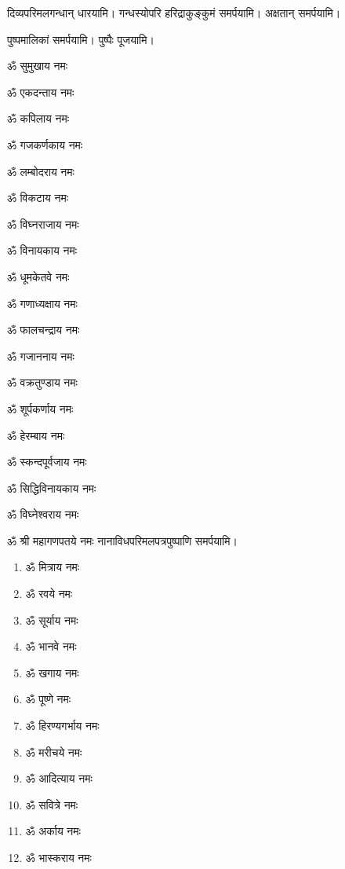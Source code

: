 \begin{center}
दिव्यपरिमलगन्धान् धारयामि। गन्धस्योपरि हरिद्राकुङ्कुमं समर्पयामि। अक्षतान् समर्पयामि।

पुष्पमालिकां समर्पयामि। पुष्पैः पूजयामि।

\clearpage
{}

\begin{enumerate}%
\begin{minipage}{0.475\linewidth} 
\item ॐ सुमुखाय नमः
\item ॐ एकदन्ताय नमः
\item ॐ कपिलाय नमः
\item ॐ गजकर्णकाय नमः
\item ॐ लम्बोदराय नमः
\item ॐ विकटाय नमः
\item ॐ विघ्नराजाय नमः
\item ॐ विनायकाय नमः
\item ॐ धूमकेतवे नमः
\end{minipage}
\begin{minipage}{0.525\linewidth}
\item ॐ गणाध्यक्षाय नमः
\item ॐ फालचन्द्राय नमः
\item ॐ गजाननाय नमः
\item ॐ वक्रतुण्डाय नमः
\item ॐ शूर्पकर्णाय नमः
\item ॐ हेरम्बाय नमः
\item ॐ स्कन्दपूर्वजाय नमः
\item ॐ सिद्धिविनायकाय नमः
\item ॐ विघ्नेश्वराय नमः
\end{minipage}
\end{enumerate}

ॐ श्री महागणपतये नमः नानाविधपरिमलपत्रपुष्पाणि समर्पयामि। \medskip

\begin{multicols}{2}
\begin{enumerate}
\item ॐ मित्राय नमः
\item ॐ रवये नमः
\item ॐ सूर्याय नमः
\item ॐ भानवे नमः
\item ॐ खगाय नमः
\item ॐ पूष्णे नमः
\item ॐ हिरण्यगर्भाय नमः
\item ॐ मरीचये नमः
\item ॐ आदित्याय नमः
\item ॐ सवित्रे नमः
\item ॐ अर्काय नमः
\item ॐ भास्कराय नमः


\end{enumerate}
\end{multicols}
\end{center}
